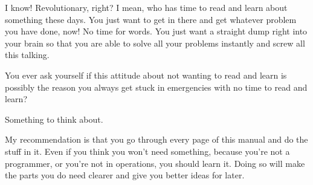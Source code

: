 I know! Revolutionary, right?  I mean, who has time to read and learn about something
these days.  You just want to get in there and get whatever problem you have done,
now! No time for words.  You just want a straight dump right into your brain so
that you are able to solve all your problems instantly and screw all this talking.

You ever ask yourself if this attitude about not wanting to read and learn is
possibly the reason you always get stuck in emergencies with no time to read
and learn?

Something to think about.

My recommendation is that you go through every page of this manual and do the
stuff in it.  Even if you think you won't need something, because you're not
a programmer, or you're not in operations, you should learn it.  Doing so will
make the parts you do need clearer and give you better ideas for later.


